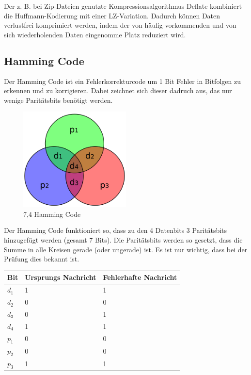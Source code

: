 Der z. B. bei Zip-Dateien genutzte Kompressionsalgorithmus Deflate kombiniert
die Huffmann-Kodierung mit einer LZ-Variation. Dadurch können Daten verlustfrei
komprimiert werden, indem der von häufig vorkommenden und von sich wiederholenden
Daten eingenomme Platz reduziert wird. 

\subsection{Hamming Code}

Der Hamming Code ist ein Fehlerkorrekturcode um 1 Bit Fehler in Bitfolgen
zu erkennen und zu korrigieren. Dabei zeichnet sich dieser dadruch aus,
das nur wenige Paritätsbits benötigt werden.

\begin{figure}[H]
    \centering
    \includegraphics[width=0.5\textwidth]{images/hamming7.4.png}
    \caption{7,4 Hamming Code}
\end{figure}

Der Hamming Code funktioniert so, dass zu den 4 Datenbits 3 Paritätsbits
hinzugefügt werden (gesamt 7 Bits). Die Paritätsbits werden so gesetzt,
dass die Summe in alle Kreisen gerade (oder ungerade) ist. Es ist nur wichtig,
dass bei der Prüfung dies bekannt ist.

\begin{table}[H]
    \begin{tabular}{|l|l|l|}
    \hline
        Bit & Ursprungs Nachricht & Fehlerhafte Nachricht \\ \hline
        $d_1$ & 1 & 1 \\ \hline
        $d_2$ & 0 & 0 \\ \hline
        $d_3$ & 0 & 1 \\ \hline
        $d_4$ & 1 & 1 \\ \hline
        $p_1$ & 0 & 0 \\ \hline
        $p_2$ & 0 & 0 \\ \hline
        $p_3$ & 1 & 1 \\ \hline
    \end{tabular}
\end{table}

